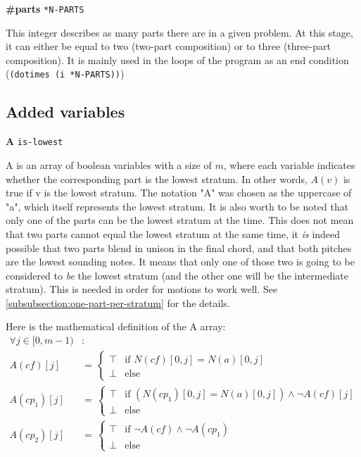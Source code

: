\vspace{.5cm} \noindent \textbf{\#parts} \hspace{.2cm} \texttt{*N-PARTS}

This integer describes as many parts there are in a given problem. At this stage, it can either be equal to two (two-part composition) or to three (three-part composition). It is mainly used in the loops of the program as an end condition (\texttt{(dotimes (i *N-PARTS))})




\subsection{Added variables}
\vspace{.5cm} \noindent \textbf{A} \hspace{.cm} \texttt{is-lowest} \label{is-lowest}

A is an array of boolean variables with a size of $m$, where each variable indicates whether the corresponding part is the lowest stratum. In other words, $A(v)$ is true if v is the lowest stratum. The notation "A" was chosen as the uppercase of "a", which itself represents the lowest stratum. 
It is also worth to be noted that only one of the parts can be the lowest stratum at the time. This does not mean that two parts cannot equal the lowest stratum at the same time, it \textit{is} indeed possible that two parts blend in unison in the final chord, and that both pitches are the lowest sounding notes. It means that only one of those two is going to be considered to \textit{be} the lowest stratum (and the other one will be the intermediate stratum). This is needed in order for motions to work well. See \ref{subsubsection:one-part-per-stratum} for the details.

Here is the mathematical definition of the A array:
\begin{equation}
\begin{aligned}
\forall j \in [0, m-1)& \colon  \\
A(cf)[j] &= \,  
\begin{cases}
    \top & \text{if } N(cf)[0,j] = N(a)[0,j] \\
    \bot & \text{else }
\end{cases}\\
A(cp_1)[j] &= \,  
\begin{cases}
    \top & \text{if } (N(cp_1)[0,j] = N(a)[0,j]) \land \neg A(cf)[j] \\
    \bot & \text{else }
\end{cases}\\
A(cp_2)[j] &= \,  
\begin{cases}
    \top & \text{if } \neg A(cf) \land \neg A(cp_1)\\
    \bot & \text{else }
\end{cases}
\end{aligned}
\end{equation}

